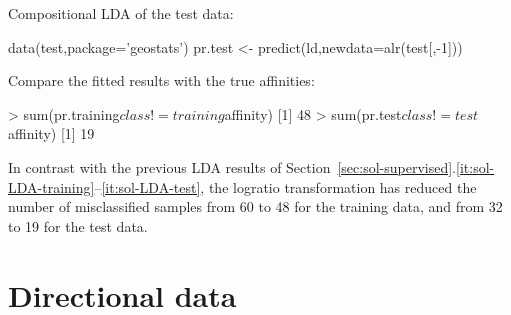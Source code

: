 \begin{enumerate}
Compositional LDA of the test data:

\begin{script}[firstnumber=4]
data(test,package='geostats')
pr.test <- predict(ld,newdata=alr(test[,-1]))
\end{script}

Compare the fitted results with the true affinities:

\begin{console}
> sum(pr.training$class != training$affinity)
[1] 48
> sum(pr.test$class != test$affinity)
[1] 19
\end{console}

In contrast with the previous LDA results of
Section~\ref{sec:sol-supervised}.\ref{it:sol-LDA-training}--\ref{it:sol-LDA-test},
the logratio transformation has reduced the number of misclassified
samples from 60 to 48 for the training data, and from 32 to 19 for the
test data.

\end{enumerate}

\section{Directional data}
\label{sec:sol-directional}

